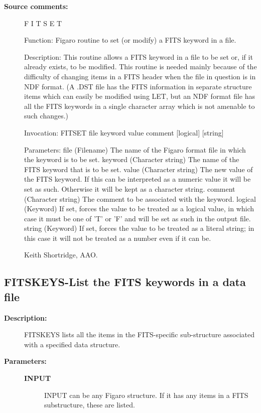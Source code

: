 \begin{description}
\begin{description}
\item [\textbf{Source comments:}]
\begin{terminalv}
 F I T S E T

 Function:
    Figaro routine to set (or modify) a FITS keyword in a file.

 Description:
    This routine allows a FITS keyword in a file to be set or, if it
    already exists, to be modified. This routine is needed mainly because
    of the difficulty of changing items in a FITS header when the file
    in question is in NDF format. (A .DST file has the FITS information
    in separate structure items which can easily be modified using LET,
    but an NDF format file has all the FITS keywords in a single
    character array which is not amenable to such changes.)

 Invocation:
    FITSET file keyword value comment [logical] [string]

 Parameters:
    file     (Filename) The name of the Figaro format file in which the
             keyword is to be set.
    keyword  (Character string) The name of the FITS keyword that is to be
             set.
    value    (Character string) The new value of the FITS keyword. If
             this can be interpreted as a numeric value it will be set as
             such. Otherwise it will be kept as a character string.
    comment  (Character string) The comment to be associated with the
             keyword.
    logical  (Keyword) If set, forces the value to be treated as a logical
             value, in which case it must be one of 'T' or 'F' and will
             be set as such in the output file.
    string   (Keyword) If set, forces the value to be treated as a literal
             string; in this case it will not be treated as a number even if
             it can be.

    Keith Shortridge, AAO.
\end{terminalv}
\end{description}
\subsection{FITSKEYS-\label{FITSKEYS}List the FITS keywords in a data file}
\begin{description}

\item [\textbf{Description:}]
 FITSKEYS lists all the items in the FITS-specific sub-structure
 associated with a specified data structure.

\item [\textbf{Parameters:}]
\begin{description}
\item [\textbf{INPUT}]
 INPUT can be any Figaro structure.  If it has any
 items in a FITS substructure, these are listed.
\end{description}


\end{description}
\end{description}
